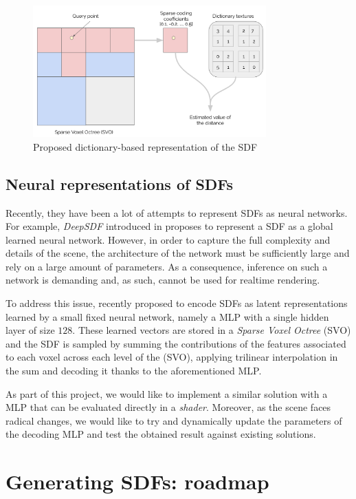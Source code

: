 \documentclass[10pt,a4paper,english, twocolumn]{article}
\begin{document}
\begin{figure}[h]
    \centering
    \includegraphics[width=0.8\textwidth]{figures/sparse-coding-sdf.png}
    \caption{Proposed dictionary-based representation of the SDF}
    \label{fig:sparse-coding-sdf}
\end{figure}

\subsection{Neural representations of SDFs}
\label{ssec:neural-sdf}
Recently, they have been a lot of attempts to represent SDFs as neural networks. For example, \textit{DeepSDF} introduced in \cite{Park_2019_CVPR} proposes to represent a SDF as a global learned neural network. However, in order to capture the full complexity and details of the scene, the architecture of the network must be sufficiently large and rely on a large amount of parameters. As a consequence, inference on such a network is demanding and, as such, cannot be used for realtime rendering.

To address this issue, \cite{takikawa2021nglod} recently proposed to encode SDFs as latent representations learned by a small fixed neural network, namely a MLP with a single hidden layer of size $128$. These learned vectors are stored in a \textit{Sparse Voxel Octree} (SVO) and the SDF is sampled by summing the contributions of the features associated to each voxel across each level of the (SVO), applying trilinear interpolation in the sum and decoding it thanks to the aforementioned MLP.

As part of this project, we would like to implement a similar solution with a MLP that can be evaluated directly in a \textit{shader}. Moreover, as the scene faces radical changes, we would like to try and dynamically update the parameters of the decoding MLP and test the obtained result against existing solutions.

\section{Generating SDFs: roadmap}



\end{document}

